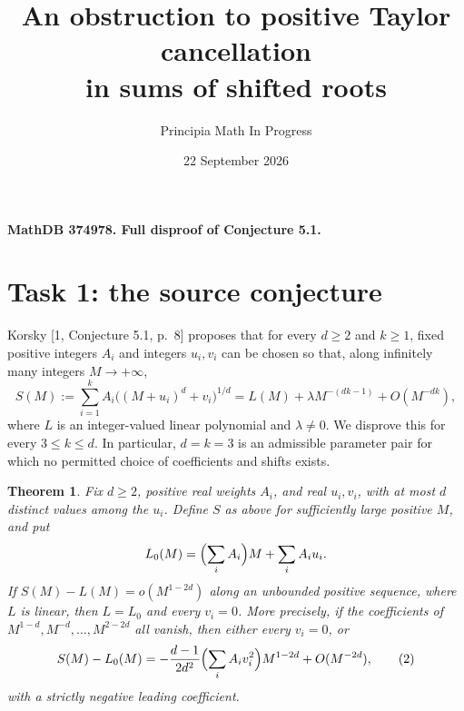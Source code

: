 \documentclass[11pt]{article}
\title{An obstruction to positive Taylor cancellation\\in sums of shifted roots}
\author{Principia Math In Progress}
\date{22 September 2026}
\newtheorem{theorem}{Theorem}
\begin{document}
\maketitle
\noindent\textbf{MathDB 374978. Full disproof of Conjecture 5.1.}

\section*{Task 1: the source conjecture}
Korsky [1, Conjecture 5.1, p.~8] proposes that for every \(d\geq2\)
and \(k\geq1\), fixed positive integers \(A_i\) and integers \(u_i,v_i\)
can be chosen so that, along infinitely many integers \(M\to+\infty\),
\[
 S(M):=\sum_{i=1}^k A_i\bigl((M+u_i)^d+v_i\bigr)^{1/d}
 =L(M)+\lambda M^{-(dk-1)}+O(M^{-dk}),                    \tag{1}
\]
where \(L\) is an integer-valued linear polynomial and
\(\lambda\ne0\). We disprove this for every \(3\leq k\leq d\).
In particular, \(d=k=3\) is an admissible parameter pair for which
no permitted choice of coefficients and shifts exists.

\begin{theorem}
Fix \(d\geq2\), positive real weights \(A_i\), and real \(u_i,v_i\),
with at most \(d\) distinct values among the \(u_i\). Define \(S\)
as above for sufficiently large positive \(M\), and put
\[
 L_0(M)=\Bigl(\sum_i A_i\Bigr)M+\sum_i A_i u_i.
\]
If \(S(M)-L(M)=o(M^{1-2d})\) along an unbounded positive sequence,
where \(L\) is linear, then \(L=L_0\) and every \(v_i=0\).
More precisely, if the coefficients of
\(M^{1-d},M^{-d},\ldots,M^{2-2d}\) all vanish, then either
every \(v_i=0\), or
\[
 S(M)-L_0(M)=
 -\frac{d-1}{2d^2}\Bigl(\sum_i A_i v_i^2\Bigr)M^{1-2d}
      +O(M^{-2d}),                                      \tag{2}
\]
with a strictly negative leading coefficient.
\end{theorem}
\end{document}
